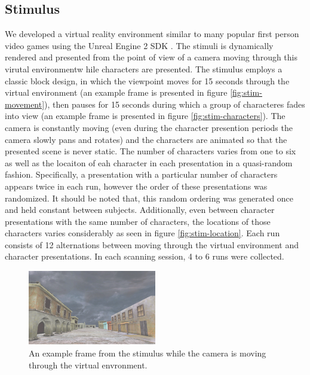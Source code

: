 \documentclass[twocolumn,draft]{article}
\begin{document}
\subsection{Stimulus}
We developed a virtual reality environment similar to many popular first person video games using the Unreal Engine 2 SDK \cite{UnrealEngine2}.
The stimuli is dynamically rendered and presented from the point of view of a camera moving through this virutal environmentw hile characters are presented.
The stimulus employs a classic block design, in which the viewpoint moves for 15 seconds through the virtual environment (an example frame is presented in figure \ref{fig:stim-movement}), then pauses for 15 seconds during which a group of characteres fades into view (an example frame is presented in figure \ref{fig:stim-characters}).
The camera is constantly moving (even during the character presention periods the camera slowly pans and rotates) and the characters are animated so that the presented scene is never static.
The number of characters varies from one to six as well as the locaiton of eah character in each presentation in a quasi-random fashion.
Specifically, a presentation with a particular number of characters appears twice in each run, however the order of these presentations was randomized.
It should be noted that, this random ordering was generated once and held constant between subjects.
Additionally, even between character presentations with the same number of characters, the locations of those characters varies considerably as seen in figure \ref{fig:stim-location}.
Each run consists of 12 alternations between moving through the virtual environment and character presentations. 
In each scanning session, 4 to 6 runs were collected.

\begin{figure}[!htbp]
\centering
\includegraphics[width=0.5\textwidth]{figures/stimulus-movement}
\caption{An example frame from the stimulus while the camera is moving through the virtual envronment.}
\label{fig:stimulus-movement}
\end{figure}
\end{document}
